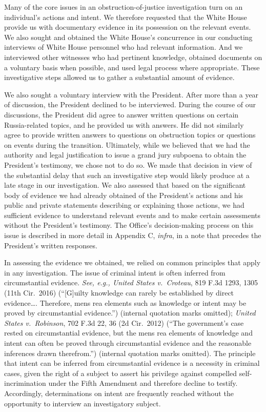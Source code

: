 Many of the core issues in an obstruction-of-justice investigation turn on an individual's actions and intent.
We therefore requested that the White House provide us with documentary evidence in its possession on the relevant events.
We also sought and obtained the White House's concurrence in our conducting interviews of White House personnel who had relevant information.
And we interviewed other witnesses who had pertinent knowledge, obtained documents on a voluntary basis when possible, and used legal process where appropriate.
These investigative steps allowed us to gather a substantial amount of evidence.

We also sought a voluntary interview with the President.
After more than a year of discussion, the President declined to be interviewed.
During the course of our discussions, the President did agree to answer written questions on certain Russia-related topics, and he provided us with answers.
He did not similarly agree to provide written answers to questions on obstruction topics or questions on events during the transition.
Ultimately, while we believed that we had the authority and legal justification to issue a grand jury subpoena to obtain the President's testimony, we chose not to do so.
We made that decision in view of the substantial delay that such an investigative step would likely produce at a late stage in our investigation.
We also assessed that based on the significant body of evidence we had already obtained of the President's actions and his public and private statements describing or explaining those actions, we had sufficient evidence to understand relevant events and to make certain assessments without the President's testimony.
The Office's decision-making process on this issue is described in more detail in Appendix C, \textit{infra}, in a note that precedes the President's written responses.

In assessing the evidence we obtained, we relied on common principles that apply in any investigation.
The issue of criminal intent is often inferred from circumstantial evidence.
\textit{See, e.g., United States v.\ Croteau}, 819 F.3d 1293, 1305 (11th Cir.~2016) (``[G]uilty knowledge can rarely be established by direct evidence\dots.
Therefore, mens rea elements such as knowledge or intent may be proved by circumstantial evidence.'') (internal quotation marks omitted);
\textit{United States v.\ Robinson}, 702 F.3d 22, 36 (2d Cir.~2012) (``The government's case rested on circumstantial evidence, but the mens rea elements of knowledge and intent can often be proved through circumstantial evidence and the reasonable inferences drawn therefrom.'') (internal quotation marks omitted).
The principle that intent can be inferred from circumstantial evidence is a necessity in criminal cases, given the right of a subject to assert his privilege against compelled self-incrimination under the Fifth Amendment and therefore decline to testify.
Accordingly, determinations on intent are frequently reached without the opportunity to interview an investigatory subject.

